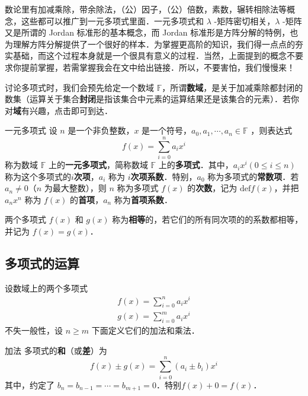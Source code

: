 
数论里有加减乘除，带余除法，（公）因子，（公）倍数，素数，辗转相除法等概念，这些都可以推广到一元多项式里面．一元多项式和 $\lambda$ -矩阵密切相关，$\lambda$ -矩阵又是所谓的 Jordan 标准形的基本概念，而 Jordan 标准形是方阵分解的特例，也为理解方阵分解提供了一个很好的样本．为掌握更高阶的知识，我们得一点点的夯实基础，而这个过程本身就是一个很具有意义的过程．当然，上面提到的概念不要求你提前掌握，若需掌握我会在文中给出链接．所以，不要害怕，我们慢慢来！

讨论多项式时，我们会预先给定一个数域 $\mathbb{F}$，所谓\textbf{数域}，是关于加减乘除都封闭的数集（运算关于集合\textbf{封闭}是指该集合中元素的运算结果还是该集合的元素）．若你对\textbf{域}有兴趣，点击即可到达．
\begin{definition}{一元多项式}
设 $n$ 是一个非负整数，$x$ 是一个符号，$a_0,a_1,\cdots,a_n\in \mathbb{F}$ ，则表达式
\begin{equation}
f(x)=\sum_{i=0}^{n}a_i x^i
\end{equation}
称为数域 $\mathbb{F}$ 上的\textbf{一元多项式}，简称数域 $\mathbb{F}$ 上的\textbf{多项式}．其中，$a_ix^i(0\leq i\leq n)$ 称为这个多项式的\textbf{$i$次项}，$a_i$ 称为 \textbf{$i$次项系数}．特别，$a_0$ 称为多项式的\textbf{常数项}．若 $a_n\neq 0$（$n$ 为最大整数），则 $n$ 称为多项式 $f(x)$ 的\textbf{次数}，记为 $\mathrm{def}f(x)$，并把 $a_nx^n$ 称为 $f(x)$ 的\textbf{首项}，$a_n$ 称为\textbf{首项系数}．
\end{definition}
两个多项式 $f(x)$ 和 $g(x)$ 称为\textbf{相等}的，若它们的所有同次项的的系数都相等，并记为 $f(x)=g(x)$．
\subsection{多项式的运算}
设数域上的两个多项式
\begin{align}
f(x)=\sum_{i=0}^{n}a_ix^i\\
g(x)=\sum_{i=0}^{m}a_ix^i
\end{align}
不失一般性，设 $n\geq m$
下面定义它们的加法和乘法．
\begin{definition}{加法}
多项式的\textbf{和}（或\textbf{差}）为
\begin{equation}
f(x)\pm g(x)=\sum_{i=0}^n (a_i\pm b_i)x^i
\label{OnePol_eq1}
\end{equation}
其中，约定了 $b_n=b_{n-1}=\cdots=b_{m+1}=0$．特别$f(x)+0=f(x)$．
\end{definition}


